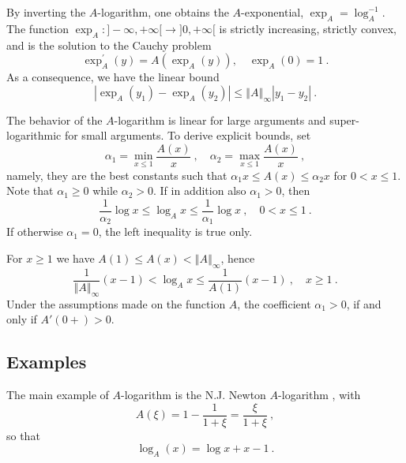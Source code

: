 \documentclass[graybox]{svmult}
\begin{document}
By inverting the $A$-logarithm, one obtains the $A$-exponential, $\exp
_{A}=\log _{A}^{-1}$. The function $\exp _{A}\colon ]-\infty ,+\infty
\lbrack \rightarrow ]0,+\infty \lbrack $ is strictly increasing, strictly
convex, and is the solution to the Cauchy problem 
\begin{equation}\label{Aexp}
\exp _{A}^{\prime }(y)=A(\exp _{A}(y)),\quad \exp _{A}(0)=1\ .
\end{equation}
As a consequence, we have the linear bound 
\begin{equation}\label{eq:lip}
\left\vert \exp _{A}(y_{1})-\exp _{A}(y_{2})\right\vert \leq \left\Vert
A\right\Vert _{\infty }\left\vert y_{1}-y_{2}\right\vert \ .
\end{equation}

The behavior of the $A$-logarithm is linear for large arguments and super-logarithmic for small arguments. To derive explicit bounds, set
\begin{equation*}
\alpha_1 = \min_{x\le 1} \frac{A(x)}x \ , \quad \alpha_2 = \max_{x \le 1} \frac{A(x)}x \ ,
\end{equation*}
namely, they are the best constants such that $\alpha_1 x \le A(x) \le \alpha_2 x$ for  $0 < x \le 1$. Note that $\alpha_1 \geq 0$ while $\alpha_2 > 0$. If in addition also $\alpha_1 > 0$, then
\begin{equation}\label{eq:bound1}
  \frac1{\alpha_2} \log x \le \log_A x \le  \frac1{\alpha_1} \log x \ , \quad 0 < x \le 1 \ .
\end{equation}
If otherwise $\alpha_1=0$, the left inequality is true only.

For $x \ge 1$ we have $A(1) \leq A(x) < \left\Vert A\right\Vert_{\infty}$, hence
\begin{equation}\label{eq:bound2}
 \frac1{\left\Vert A\right\Vert_{\infty}}(x-1) < \log_A x \leq \frac1{A(1)}(x-1) \ , \quad x \ge 1 \ .
\end{equation}
Under the assumptions made on the function $A$, the coefficient $\alpha_1 > 0$, if and only if $A'(0+) > 0$. 
\subsection{Examples}
\label{sec:examples}
The main example of $A$-logarithm is the N.J. Newton $A$-logarithm 
\cite{newton:2012}, with 
\begin{equation*}
A(\xi)=1-\frac1{1+\xi}=\frac{\xi}{1+\xi} \ ,
\end{equation*}
so that 
\begin{equation*}
\log_A(x) = \log x + x - 1\ .
\end{equation*}
\end{document}
